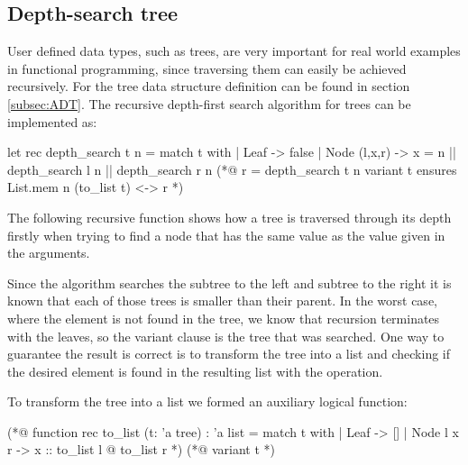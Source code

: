 


\subsection{Depth-search tree}

User defined data types, such as trees, are very important for real world examples in functional programming, since traversing them
can easily be achieved recursively. For the tree data structure definition can be found in section \ref{subsec:ADT}. The recursive 
depth-first search algorithm for trees can be implemented as:

\begin{gospell}
let rec depth_search t n = 
  match t with
  | Leaf -> false
  | Node (l,x,r) -> x = n || depth_search l n || depth_search r n
(*@
  r = depth_search t n
  variant t
  ensures List.mem n (to_list t) <-> r
*)
\end{gospell}

The following recursive function  shows how a tree is traversed through its depth firstly when trying to find
a node that has the same value as the value given in the arguments.

Since the algorithm searches the subtree to the left and subtree to the right it is known that each of those trees is smaller than their
parent. In the worst case, where the element is not found in the tree, we know that recursion terminates with the leaves, so the variant 
clause is the tree that was searched. One way to guarantee the result is correct is to transform the tree into a list and checking if
the desired element is found in the resulting list with the  operation.

To transform the tree into a list we formed an auxiliary logical function:

\begin{gospell}
(*@ function rec to_list (t: 'a tree) : 'a list = 
  match t with
  | Leaf -> []
  | Node l x r -> x :: to_list l @ to_list r
*)
(*@
  variant t
*)
\end{gospell}

